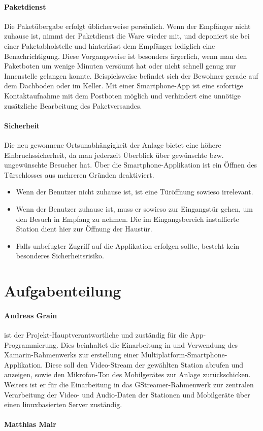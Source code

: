 \paragraph{Paketdienst}
Die Paketübergabe erfolgt üblicherweise persönlich.
Wenn der Empfänger nicht zuhause ist, nimmt der Paketdienst die Ware wieder mit, und deponiert sie bei einer Paketabholstelle und hinterlässt dem Empfänger lediglich eine Benachrichtigung.
Diese Vorgangsweise ist besonders ärgerlich, wenn man den Paketboten um wenige Minuten versäumt hat oder nicht schnell genug zur Innenstelle gelangen konnte.
Beispielsweise befindet sich der Bewohner gerade auf dem Dachboden oder im Keller.
Mit einer Smartphone-App ist eine sofortige Kontaktaufnahme mit dem Postboten möglich und verhindert eine unnötige zusätzliche Bearbeitung des Paketversandes.

\paragraph{Sicherheit}
Die neu gewonnene Ortsunabhängigkeit der Anlage bietet eine höhere Einbruchssicherheit, da man jederzeit Überblick über gewünschte bzw. ungewünschte Besucher hat.
Über die Smartphone-Applikation ist ein Öffnen des Türschlosses aus mehreren Gründen deaktiviert.
\begin{itemize}
    \item Wenn der Benutzer nicht zuhause ist, ist eine Türöffnung sowieso irrelevant.
    \item Wenn der Benutzer zuhause ist, muss er sowieso zur Eingangstür gehen, um den Besuch in Empfang zu nehmen. Die im Eingangsbereich installierte Station dient hier zur Öffnung der Haustür.
    \item Falls unbefugter Zugriff auf die Applikation erfolgen sollte, besteht kein besonderes Sicherheitsrisiko.
\end{itemize}

\section{Aufgabenteilung}
\paragraph{Andreas Grain} ist der Projekt-Hauptverantwortliche und zuständig für die App-Program\-mierung.
Dies beinhaltet die Einarbeitung in und Verwendung des Xamarin-Rahmenwerks zur erstellung einer Multiplatform-Smartphone-Applikation.
Diese soll den Video-Stream der gewählten Station abrufen und anzeigen, sowie den Mikrofon-Ton des Mobilgerätes zur Anlage zurückschicken.
Weiters ist er für die Einarbeitung in das GStreamer-Rahmenwerk zur zentralen Verarbeitung der Video- und Audio-Daten der Stationen und Mobilgeräte über einen linuxbasierten Server zuständig.

\paragraph{Matthias Mair}